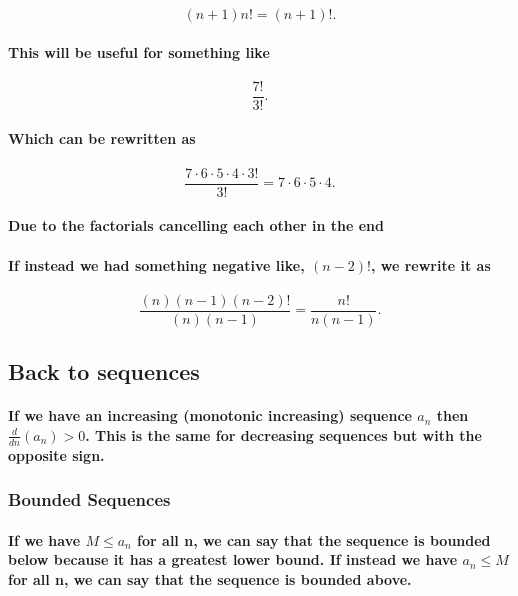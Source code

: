 \[
	\left( n+1 \right) n! = \left( n+1 \right) !
.\] 

\paragraph{This will be useful for something like}
\[
\frac{ 7! }{ 3! }
.\] 

\paragraph{Which can be rewritten as}
\[
\frac{ 7\cdot 6\cdot 5\cdot 4\cdot 3! }{ 3! }=7\cdot 6\cdot 5\cdot 4
.\] 
\paragraph{Due to the factorials cancelling each other in the end}

\paragraph{If instead we had something negative like, $ \left( n-2 \right) ! $, we rewrite it as}

\[
\frac{ \left( n \right) \left( n-1 \right) \left( n-2 \right) ! }{ \left( n \right) \left( n-1 \right)  } = \frac{ n! }{ n\left( n-1 \right)  }
.\] 

\subsection{Back to sequences}%
\label{sub:Back to sequences}

\paragraph{If we have an increasing (monotonic increasing) sequence $ a_n $ then $ \frac{d}{dn}\left( a_n \right) >0 $. This is the same for decreasing sequences but with the opposite sign.}

\subsubsection{Bounded Sequences}

\paragraph{If we have $ M\le a_n $ for all n, we can say that the sequence is bounded below because it has a greatest lower bound. If instead we have $ a_n \le M $ for all n, we can say that the sequence is bounded above.}


